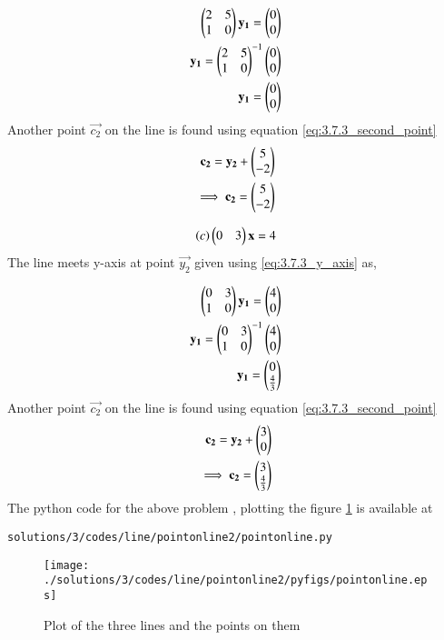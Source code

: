\begin{enumerate}[label=\thesection.\arabic*.,ref=\thesection.\theenumi]
\begin{align}
\begin{pmatrix}2&5\\1&0\end{pmatrix}\mathbf{y_1} =\begin{pmatrix}0\\0\end{pmatrix}
\\
\mathbf{y_1}={\begin{pmatrix}2&5\\1&0\end{pmatrix}}^{-1}\begin{pmatrix}0\\0\end{pmatrix}
\\
\mathbf{y_1}=\begin{pmatrix}0\\0\end{pmatrix}
\end{align}
Another point $\vec{c_2}$ on the line is found using equation \ref{eq:3.7.3_second_point}
\begin{align}
\mathbf{c_2} = \mathbf{y_2} + \begin{pmatrix}5\\-2\end{pmatrix}
\\
\implies \mathbf{c_2} = \begin{pmatrix}5\\-2\end{pmatrix}
\end{align}

\begin{align}
\left(c\right)\begin{pmatrix}0&3\end{pmatrix}\mathbf{x}=4
\end{align}
The line meets y-axis at point $\vec{y_2}$ given using \ref{eq:3.7.3_y_axis} as,
 
\begin{align}
\begin{pmatrix}0&3\\1&0\end{pmatrix}\mathbf{y_1} =\begin{pmatrix}4\\0\end{pmatrix}
\\
\mathbf{y_1}={\begin{pmatrix}0&3\\1&0\end{pmatrix}}^{-1}\begin{pmatrix}4\\0\end{pmatrix}
\\
\mathbf{y_1}=\begin{pmatrix}0\\\frac{4}{3}\end{pmatrix}
\end{align}
Another point $\vec{c_2}$ on the line is found using equation \ref{eq:3.7.3_second_point}
\begin{align}
\mathbf{c_2} = \mathbf{y_2} + \begin{pmatrix}3\\0\end{pmatrix}
\\
\implies \mathbf{c_2} = \begin{pmatrix}3\\\frac{4}{3}\end{pmatrix}
\end{align}
The python code for the above problem , plotting the figure \ref{fig:3.7.3_three_lines} is available at 
\begin{lstlisting}
solutions/3/codes/line/pointonline2/pointonline.py
\end{lstlisting}
\begin{figure}[!ht]
\centering
\texttt{[image: ./solutions/3/codes/line/pointonline2/pyfigs/pointonline.eps]}
\caption{Plot of the three lines and the points on them }
\label{fig:3.7.3_three_lines}
\end{figure}
\end{enumerate}

